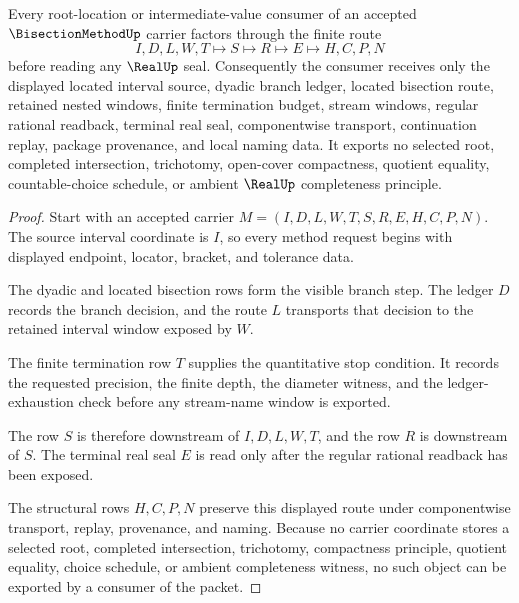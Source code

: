 \begin{theorem}
\label{thm:bisection-method-real-seal-route}
Every root-location or intermediate-value consumer of an accepted $\BisectionMethodUp$ carrier factors through the finite route
$$
I,D,L,W,T \longmapsto S \longmapsto R \longmapsto E \longmapsto H,C,P,N
$$
before reading any $\RealUp$ seal. Consequently the consumer receives only the displayed located interval source, dyadic branch ledger, located bisection route, retained nested windows, finite termination budget, stream windows, regular rational readback, terminal real seal, componentwise transport, continuation replay, package provenance, and local naming data. It exports no selected root, completed intersection, trichotomy, open-cover compactness, quotient equality, countable-choice schedule, or ambient $\RealUp$ completeness principle.
\end{theorem}
\begin{proof}
Start with an accepted carrier $M=(I,D,L,W,T,S,R,E,H,C,P,N)$. The source interval coordinate is $I$, so every method request begins with displayed endpoint, locator, bracket, and tolerance data.

The dyadic and located bisection rows form the visible branch step. The ledger $D$ records the branch decision, and the route $L$ transports that decision to the retained interval window exposed by $W$.

The finite termination row $T$ supplies the quantitative stop condition. It records the requested precision, the finite depth, the diameter witness, and the ledger-exhaustion check before any stream-name window is exported.

The row $S$ is therefore downstream of $I,D,L,W,T$, and the row $R$ is downstream of $S$. The terminal real seal $E$ is read only after the regular rational readback has been exposed.

The structural rows $H,C,P,N$ preserve this displayed route under componentwise transport, replay, provenance, and naming. Because no carrier coordinate stores a selected root, completed intersection, trichotomy, compactness principle, quotient equality, choice schedule, or ambient completeness witness, no such object can be exported by a consumer of the packet.
\end{proof}


